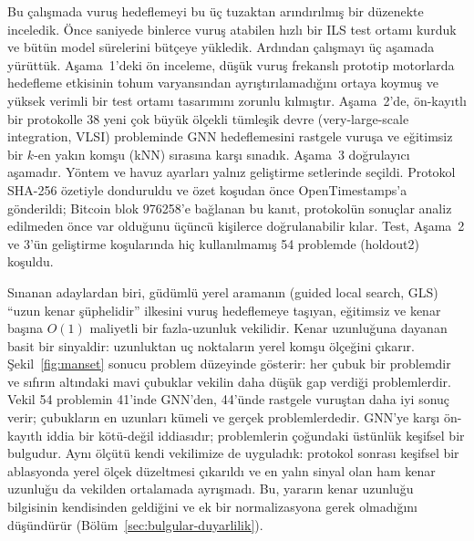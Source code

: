 Bu çalışmada vuruş hedeflemeyi bu üç tuzaktan arındırılmış bir düzenekte inceledik. Önce saniyede
binlerce vuruş atabilen hızlı bir ILS test ortamı kurduk ve bütün model sürelerini bütçeye yükledik.
Ardından çalışmayı üç aşamada yürüttük. Aşama~1'deki ön inceleme, düşük vuruş frekanslı prototip
motorlarda hedefleme etkisinin tohum varyansından ayrıştırılamadığını ortaya koymuş ve yüksek
verimli bir test ortamı tasarımını zorunlu kılmıştır. Aşama~2'de, ön-kayıtlı bir protokolle 38
yeni çok büyük ölçekli tümleşik devre (very-large-scale integration, VLSI) probleminde GNN
hedeflemesini rastgele vuruşa ve eğitimsiz bir $k$-en yakın komşu (kNN) sırasına karşı sınadık.
Aşama~3 doğrulayıcı aşamadır. Yöntem ve havuz ayarları yalnız geliştirme setlerinde seçildi. Protokol
SHA-256 özetiyle donduruldu ve özet koşudan önce OpenTimestamps'a gönderildi; Bitcoin blok
976258'e bağlanan bu kanıt, protokolün sonuçlar analiz edilmeden önce var olduğunu üçüncü
kişilerce doğrulanabilir kılar. Test, Aşama~2 ve 3'ün geliştirme koşularında hiç kullanılmamış 54
problemde (holdout2) koşuldu.

Sınanan adaylardan biri, güdümlü yerel aramanın (guided local search, GLS) ``uzun kenar şüphelidir''
ilkesini \citep{voudouris_1999_gls} vuruş hedeflemeye taşıyan, eğitimsiz ve kenar başına $O(1)$
maliyetli bir fazla-uzunluk vekilidir. Kenar uzunluğuna dayanan basit bir sinyaldir: uzunluktan uç
noktaların yerel komşu ölçeğini çıkarır. Şekil~\ref{fig:manset} sonucu problem düzeyinde gösterir: her çubuk bir problemdir ve
sıfırın altındaki mavi çubuklar vekilin daha düşük gap verdiği problemlerdir. Vekil 54 problemin
41'inde GNN'den, 44'ünde rastgele vuruştan daha iyi sonuç verir; çubukların en uzunları kümeli ve
gerçek problemlerdedir.
GNN'ye karşı ön-kayıtlı iddia bir kötü-değil iddiasıdır; problemlerin çoğundaki üstünlük keşifsel
bir bulgudur. Aynı ölçütü kendi vekilimize de uyguladık: protokol sonrası keşifsel bir ablasyonda
yerel ölçek düzeltmesi çıkarıldı ve en yalın sinyal olan ham kenar uzunluğu da vekilden ortalamada
ayrışmadı. Bu, yararın kenar uzunluğu bilgisinin kendisinden geldiğini ve ek bir normalizasyona
gerek olmadığını düşündürür (Bölüm~\ref{sec:bulgular-duyarlilik}).


